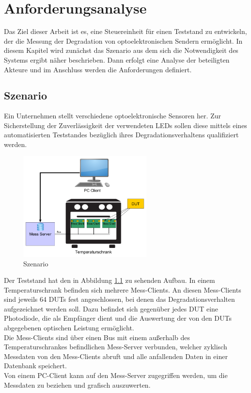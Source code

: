 
\chapter{Anforderungsanalyse}
\label{chapter_Anforderungsanalyse}
Das Ziel dieser Arbeit ist es, eine Steuereinheit für einen Teststand zu entwickeln, der die Messung der Degradation von optoelektronischen Sendern ermöglicht. In diesem Kapitel wird zunächst das Szenario aus dem sich die Notwendigkeit des Systems ergibt näher beschrieben. Dann erfolgt eine Analyse der beteiligten Akteure und im Anschluss werden die Anforderungen definiert.

\section{Szenario}
Ein Unternehmen stellt verschiedene optoelektronische Sensoren her. Zur Sicherstellung der Zuverlässigkeit der verwendeten \acp{LED} sollen diese mittels eines automatisierten Teststandes bezüglich ihres Degradationsverhaltens qualifiziert werden.


\begin{figure}[H]
\begin{center}
\includegraphics[width=0.6\textwidth]{img/general/Szenario.png}
\caption{Szenario}
\label{figure_Szenario}
\end{center}
\end{figure}

Der Teststand hat den in Abbildung \ref{figure_Szenario} zu sehenden Aufbau.
In einem Temperaturschrank befinden sich mehrere Mess-Clients. An diesen Mess-Clients sind jeweils 64 \acp{DUT} fest angeschlossen, bei denen das Degradationsverhalten aufgezeichnet werden soll. Dazu befindet sich gegenüber jedes \ac{DUT} eine Photodiode, die als Empfänger dient und die Auswertung der von den \acp{DUT} abgegebenen optischen Leistung ermöglicht.\\
Die Mess-Clients sind über einen Bus mit einem außerhalb des Temperaturschrankes befindlichen Mess-Server verbunden, welcher zyklisch Messdaten von den Mess-Clients abruft und alle anfallenden Daten in einer Datenbank speichert.\\
Von einem PC-Client kann auf den Mess-Server zugegriffen  werden, um die Messdaten zu beziehen und grafisch auszuwerten.\\

